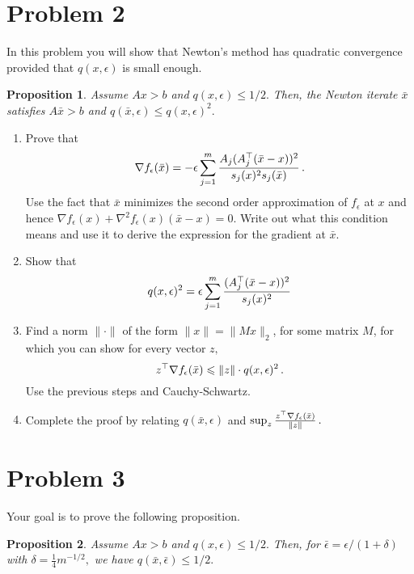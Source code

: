 \documentclass[12pt]{article}
\newtheorem{prop}{Proposition}
\begin{document}
\section*{Problem 2}

In this problem you will show that Newton's method has quadratic convergence
provided that $q(x,\epsilon)$ is small enough.

\begin{prop}
\label{prop:two}
Assume $Ax>b$ and $q(x, \epsilon)\le 1/2.$ Then, the Newton iterate $\bar x$
satisfies $A\bar x>b$ and $q(\bar x, \epsilon)\le q(x, \epsilon)^2.$
\end{prop}

\begin{enumerate}
\item
Prove that
\[
\nabla f_\epsilon(\bar x)
=
-\epsilon \sum_{j=1}^m \frac{A_j(A_j^\top(\bar x - x))^2}{s_j(x)^2s_j(\bar x)}\,.
\]
Use the fact that $\bar x$ minimizes the second order approximation of
$f_\epsilon$ at $x$ and hence $\nabla f_\epsilon(x)+ \nabla^2f_\epsilon(x)(\bar
x-x)=0.$ Write out what this condition means and use it to derive the expression
for the gradient at $\bar x.$

\item
Show that
\[
q(x, \epsilon)^2
= \epsilon\sum_{j=1}^m \frac{(A_j^\top(\bar x-x))^2}{s_j(x)^2}
\]

\item
Find a norm $\|\cdot\|$ of the form $\| x\| = \|M x\|_2$, for some matrix $M$, for which you can show for every vector $z,$
\[
z^\top \nabla f_\epsilon(\bar x) 
\leqslant \|z\|\cdot q(x,\epsilon)^2\,.
\]
Use the previous steps and Cauchy-Schwartz. 

\item
Complete the proof by relating $q(\bar x, \epsilon)$
and $\sup_z 
\frac{z^\top \nabla f_\epsilon(\bar x)}{\|z\|}\,.$
\end{enumerate}


\section*{Problem 3}

Your goal is to prove the following proposition.

\begin{prop}
Assume $Ax>b$ and $q(x, \epsilon)\le1/2.$ Then, for
$\bar\epsilon=\epsilon/(1+\delta)$ with $\delta=\frac14m^{-1/2},$ we have 
$q(\bar x, \bar\epsilon)\le 1/2.$
\end{prop}
\end{document}
